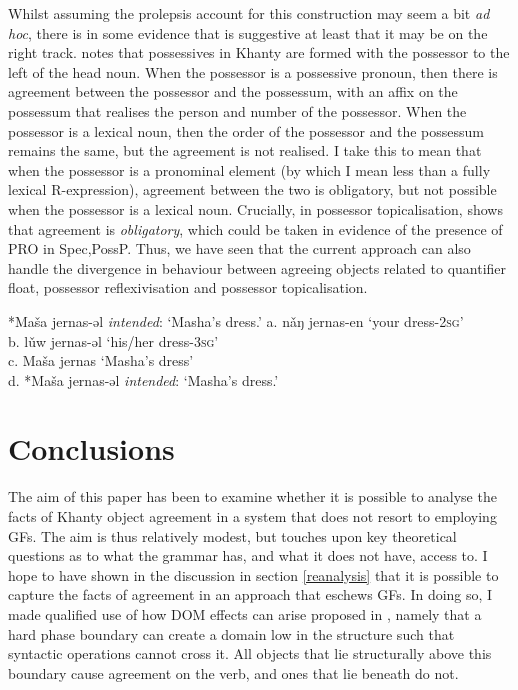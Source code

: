 \documentclass[output=paper
,modfonts
,nonflat]{langsci/langscibook}
\begin{document}
Whilst assuming the prolepsis account for this construction may seem a bit \emph{ad hoc}, there is in some evidence that is suggestive at least that it may be on the right track. 
\citet[][345]{nikolaeva1999} notes that possessives in Khanty are formed with the possessor to the left of the head noun. 
When the possessor is a possessive pronoun, then there is agreement between the possessor and the possessum, with an affix on the possessum that realises the person and number of the possessor.
When the possessor is a lexical noun, then the order of the possessor and the possessum remains the same, but the agreement is not realised.
I take this to mean that when the possessor is a pronominal element (by which I mean less than a fully lexical R-expression), agreement between the two is obligatory, but not possible when the possessor is a lexical noun. Crucially, in possessor topicalisation, \citeauthor{nikolaeva1999} shows that agreement is \emph{obligatory}, which could be taken in evidence of the presence of PRO in Spec,PossP.  
Thus, we have seen that the current approach can also handle the divergence in behaviour between agreeing objects related to quantifier float, possessor reflexivisation and possessor topicalisation.

\begin{exe}
	\ex
	\begin{tabbing}
		*Ma\v{s}a jernas-əl\hspace{10mm} \= \emph{intended}: `Masha's dress.'\kill
				a.	n\v{a}ŋ jernas-en			\> 	`your dress-\textsc{2sg}'\\
		b.	l\v{u}w jernas-əl 	\>	`his/her dress-\textsc{3sg}'\\
		c.	Ma\v{s}a jernas			\>	 `Masha's dress'\\
		d. 	*Ma\v{s}a jernas-əl	\>	 \emph{intended}: `Masha's dress.'\\
	\end{tabbing} 
\end{exe}

\section{Conclusions}\label{conclusion}

The aim of this paper has been to examine whether it is possible to analyse the facts of Khanty object agreement in a system that does not resort to employing GFs. 
The aim is thus relatively modest, but touches upon key theoretical questions as to what the grammar has, and what it does not have, access to.
I hope to have shown in the discussion in section \ref{reanalysis} that it is possible to capture the facts of agreement in an approach that eschews GFs. 
In doing so, I made qualified use of how DOM effects can arise proposed in \citet{Baker2015}, namely that a hard phase boundary can create a domain low in the structure such that syntactic operations cannot cross it.
All objects that lie structurally above this boundary cause agreement on the verb, and ones that lie beneath do not.
\end{document}
